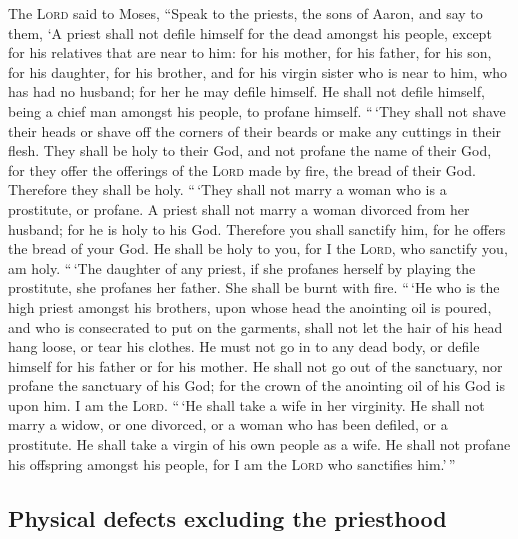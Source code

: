  The \textsc{Lord} said to Moses, ``Speak to the priests,
the sons of Aaron, and say to them, `A priest shall not defile himself
for the dead amongst his people,  except for his relatives
that are near to him: for his mother, for his father, for his son, for
his daughter, for his brother,  and for his virgin sister
who is near to him, who has had no husband; for her he may defile
himself.  He shall not defile himself, being a chief man
amongst his people, to profane himself.  ``\,`They shall
not shave their heads or shave off the corners of their beards or make
any cuttings in their flesh.  They shall be holy to their
God, and not profane the name of their God, for they offer the offerings
of the \textsc{Lord} made by fire, the bread of their God. Therefore
they shall be holy.  ``\,`They shall not marry a woman who
is a prostitute, or profane. A priest shall not marry a woman divorced
from her husband; for he is holy to his God.  Therefore
you shall sanctify him, for he offers the bread of your God. He shall be
holy to you, for I the \textsc{Lord}, who sanctify you, am holy.
 ``\,`The daughter of any priest, if she profanes herself
by playing the prostitute, she profanes her father. She shall be burnt
with fire.  ``\,`He who is the high priest amongst his
brothers, upon whose head the anointing oil is poured, and who is
consecrated to put on the garments, shall not let the hair of his head
hang loose, or tear his clothes.  He must not go in to
any dead body, or defile himself for his father or for his mother.
 He shall not go out of the sanctuary, nor profane the
sanctuary of his God; for the crown of the anointing oil of his God is
upon him. I am the \textsc{Lord}.  ``\,`He shall take a
wife in her virginity.  He shall not marry a widow, or
one divorced, or a woman who has been defiled, or a prostitute. He shall
take a virgin of his own people as a wife.  He shall not
profane his offspring amongst his people, for I am the \textsc{Lord} who
sanctifies him.'\,''

\hypertarget{physical-defects-excluding-the-priesthood}{%
\subsection{Physical defects excluding the
priesthood}\label{physical-defects-excluding-the-priesthood}}

